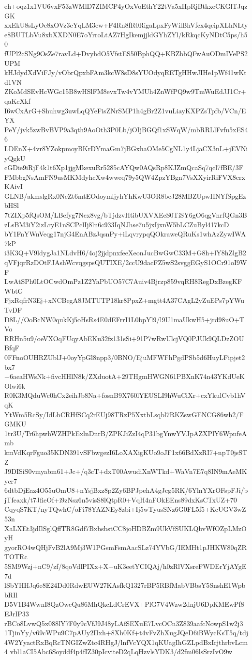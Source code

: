 eh+oqz1x1VU6vxF53zWMlD7ZIMCP4yOxVoEthY22tVa5xHpRjBtkxeCKGlTJqzGK
xxEkU8sLyOc8xOVz3cYqLM3ew+F4Rn8fR0RigaLpxFyWilBhVfcx4qcipXLhNLty
e8BUTLbVu8xbXXDN0E7oYrroLtAZ7HgIkemjjldGYhZYl/kRkqcKyNDtC5ps/h50
fUPl2cSNg9OsZe7ravLd+DvyhdO5VfstES50BphQQ+KBZbbQFwAuODmIVePS2UPM
kHJdydXdViFJy/vObrQpxbFAm3kcW8sD8sYUOdyqRETgHHwJIHe1pWf41wKtd1VN
ZKoMdSEvHcWGc15B8wHSlFM8evxTw4vYMUh4ZnWfPQ9w9TmWuEdJJ1Cr+qaKcXkf
I6wCxArG+Shuhwg3uwLqQYeFisZNrSMP1h4gBr2Z1vuLiayKXPZsTpfb/VCn/EYX
PeY/jvk5zwBvBVP9a3qth9AoOth3P0Lb/jOIjBGQf1xSWqW/mbRRLlFvfu5xES46
LDEnX+4vr8YZokpmoyBKrDYmaGm7jBGxhaOMe5CgNL1y4LjaCX3nL+jEVNiyQgkU
cGDie9iRjF4k1t6Xp1jjgMkexuRr5285cAYQw0AQsRp8KJZmQcaSq7qcl7fBE/3F
FMbbgNsAmFN9usMKMdyhcXw4wweq79y5QW4ZpzYBgn7VsXXyirRiFVX8crxKAivI
GLNB/akmslgRx0NeZt6mtEOdoymljyhYhKwU3OR8beJ28MBZUpwHNYfSpgEzbHSl
7tZIXp5fQsOM/LBefyg7Ncx8vg/bTjdzvHtibUXVXEeS0TiSY6gO6qgVnrfQGn3B
zLsBM3iY2izLryE1nSCPclIj8ln6c933IqNJhse7u5jxIjxnW5bLCZuByl417kcD
bY1FnYWnVeqg17njG4EnABzJqsnPy+iLqvrypqQOkraweQRuKs1whAzZywIWA7kP
i3K3Q+V9ldygJa1NLdvH6/4oj2jjdpnxfeeXeonJucBwGwC33M+G8h+lY8hZlgB2
qVFjqrRzDOtFJAshWcvqgspsQUTIXE/2ccU9dacFZ5wS2svggEGyS1OCr91oI9WF
LwAtSPh0LtOCwdOmPz1Z2YaPbUO57C7Auiv4Bjrzp859vqRH8RegDxBzegKFWbtG
FjxRqfrN3Ej+xNCBegA8JMTUTP18kr8PpxZ+mgtt4A37CAgL2yZuEPs7pYWuTvDF
D8L//OoBcNW0qukKj5oHsRs4E0dEFrrI1L0bpYl9/l9U1maUkwH5+jrd98uO+TVo
RRHn5u9/oeVXOqFUqyAbEKu32fz131sSi+91P7wRwUlcjVQ0PJUk9QLDzZOUBfqF
0FFnoOUHRZUblJ+0oyYpGl8npp3/0BNO/EjuMFWFhPgdPSb5d6HuyLFipjet2bx7
+6aeaHWsNk+fivcHHlN8k/ZXduotA+29THgmHWGN61PBXnK74n43YKdUeKOlwi6k
R0K3MQduWc0hCx2eihJb8Na+fosnB9X760lYEUSLI9hWuCiXr+cxYkulCvb1hVqK
YtWm5RcSy/IdLbCRHfSCq2rEUj98TRzP5XxtbLsqbl7RKZswGENCG86wh2/FGMKU
1tr3U/Tr6hpwhWZHPkExlnDnrB/ZPKJiZzI4qP31bgYnwYVJpAZXPlY6WpnfeAmb
kmVdKqrFguo35KDN391vSFbwgezI6LoXAXigKUo9oJF1x66BdXzRI7+npT0jsSTZ
J9DISiS0vmyabm61+Jc+/q3cT+dxT00AwudiXnWTkd+WaVn7E7q8IN9mAeMKycr7
6dtbDjEaz4O55uOmU8+nYsjBxz8p2Zy6BPJpehA4gJcg5RK/6YlnYXrOFspFJi/b
jTfeaxk/t7JfieOf+i9zNsz6n5visS8lQtpR0+VqH4nFOkEEns89dxKsCTxUZ+70
CqyqS7KT/nyTQwhC/oFi78YAZNEy8zbi+Ij5wTyusSNz6G0FL5f5+KcUGV3wZ53n
XaLXEt3jdIlSglQffTR8Gdf7BxbsbstCC8joHDBZm9UkVfSUKLQbvWfOZpLMzOyH
gyorRO4wQHjFvB2lA9Mj3W1PGsmFsmAacSLz74YVbG/IEMHt1pJHKW80qZRTOTRc
5SM9Wzj+nC9/zf/8qoVdlPIXx+X+uK3eetYCIQAj/h0zRlVXsreFWDErYjAYgE7d
lSbYHHJq6e8E24Dd0RdwEUW27KAsfkQ1327rBP5RBfMabVBbsY5SnshE1WpbbRIl
D5V1B4WwnI8QzOweQu86MhQkcLdCrEVX+PlG7V4Wzw2dnjU6DpKMEwPf8EJrIP33
rBCo8LvwQ5x088lY7F0y9cVfJ9J48yLAfSEXuE7LvcOCn3Z839aafcNowpS1w2j3
1TjinYy/v69cWPu9C7pAUy2IIxh+8Xh0Kf+t4vFvZhXugJQeD6iBWycKsT5q/tdj
4W2YyactRxBqRcTNGIZwZtc4RHgJ/lnfVcYQX1qKUagIhGZLpdBxIrjthrbvLcm4
vbl1aCI5Abc6Soyddf4p4fIZ30pIcviteD2qLqHzvlsYDK3/d2fm06lsSrzIvO9w
